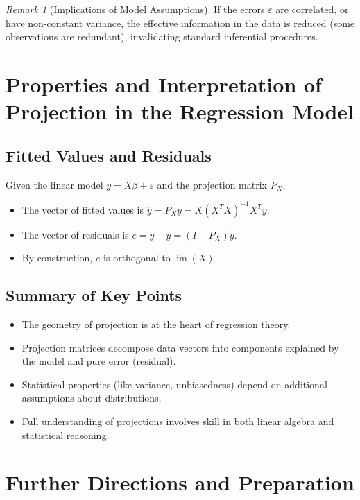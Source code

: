 \documentclass[11pt,a4paper]{article}
\theoremstyle{definition}
\theoremstyle{plain}
\theoremstyle{remark}
\newtheorem{remark}[definition]{Remark}
\begin{document}
\begin{remark}[Implications of Model Assumptions]
If the errors $\varepsilon$ are correlated, or have non-constant variance, the effective information in the data is reduced (some observations are redundant), invalidating standard inferential procedures.
\end{remark}

\section{Properties and Interpretation of Projection in the Regression Model}

\subsection{Fitted Values and Residuals}

Given the linear model $y = X\beta + \varepsilon$ and the projection matrix $P_X$,
\begin{itemize}
    \item The vector of fitted values is $\hat{y} = P_X y = X (X^T X)^{-1} X^T y$.
    \item The vector of residuals is $e = y - \hat{y} = (I - P_X) y$.
    \item By construction, $e$ is orthogonal to $\operatorname{im}(X)$.
\end{itemize}

\subsection{Summary of Key Points}
\begin{itemize}
    \item The geometry of projection is at the heart of regression theory.
    \item Projection matrices decompose data vectors into components explained by the model and pure error (residual).
    \item Statistical properties (like variance, unbiasedness) depend on additional assumptions about distributions.
    \item Full understanding of projections involves skill in both linear algebra and statistical reasoning.
\end{itemize}

\section{Further Directions and Preparation}
\end{document}
